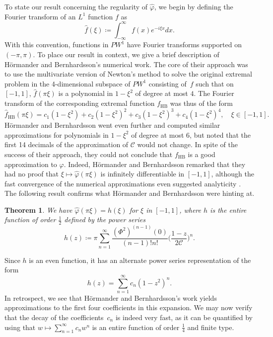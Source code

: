 \documentclass[12pt]{amsart}
\theoremstyle{plain}
\newtheorem{theorem}{Theorem}[section]
\numberwithin{equation}{section}
\theoremstyle{definition}
\renewcommand{\phi}{\varphi}
\newcommand{\Cone}{\mathscr{C}}
\begin{document}
To state our result concerning the regularity of $\widehat{\phi}$, we begin by defining the Fourier transform of an $L^1$ function $f$ as
\[ \widehat{f}(\xi)\coloneqq \int_{-\infty}^\infty f(x) e^{-i\xi x} dx. \]
With this convention, functions in $PW^1$ have Fourier transforms supported on $(-\pi,\pi)$.
To place our result in context, we give a brief description of H\"{o}rmander and Bernhardsson's numerical work. The core of their approach
was to use the multivariate version of Newton's method to solve the original extremal problem in the 4-dimensional subspace of $PW^1$ consisting of~$f$ such that on $[-1,1]$, $\widehat{f}(\pi \xi)$ is a polynomial in $1-\xi^2$ of degree at most $4$. The Fourier transform of the corresponding extremal function $f_{\text{HB}}$ was thus of the form
\[ \widehat{f}_{\text{HB}}(\pi \xi) = c_1(1-\xi^2)+c_2(1-\xi^2)^2+c_3(1-\xi^2)^3+c_4(1-\xi^2)^4 , \quad \xi \in [-1,1]. \]
H\"{o}rmander and Bernhardsson went even further and computed similar approximations for polynomials in $1-\xi^2$ of degree at most $6$, but noted that the first 14 decimals of the approximation of $\Cone$ would not change.  In spite of the success of their approach, they could not conclude that $f_{\text{HB}}$ is a good approximation to $\varphi$. Indeed, H\"{o}rmander and Bernhardsson remarked that they had no proof that $\xi\mapsto \widehat{\varphi}(\pi\xi)$
is infinitely differentiable in $[- 1, 1 ]$, although the fast convergence of the
numerical approximations even suggested analyticity  \cite[p. 92]{HB93}. The following result confirms what H\"{o}rmander and Bernhardsson were hinting at.
\begin{theorem} \label{thm:phifourier}
We have
$\widehat{\phi}(\pi \xi) = h (\xi)$ for $\xi$ in $[-1,1]$, where $h$ is the entire function of order $\frac12$ defined by the power series
	\begin{equation} \label{eq:phifourier}
	h(z)\coloneqq \pi\sum_{n=1}^\infty  \frac{(\Phi^2)^{(n-1)}(0)}{(n-1)! n!} \Big( \frac{1-z}{2\Cone}\Big)^n .
	\end{equation}
\end{theorem}
Since $h$ is an even function, it has an alternate power series representation of the form
\[ h(z)=\sum_{n=1}^\infty c_n (1-z^2)^n .\]
In retrospect, we see that H\"{o}rmander and Bernhardsson's work yields approximations to the first four coefficients  in this expansion. We may now verify that the decay of the coefficients~$c_n$ is indeed very fast, as it  can be quantified by using that  $w\mapsto \sum_{n=1}^\infty c_n w^n$ is an entire function of order $\frac14$ and finite type.
\end{document}
